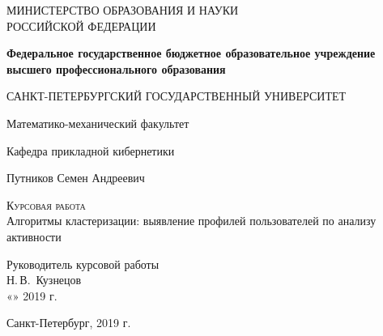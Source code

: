 \documentclass[a4paper]{article}
\begin{document}
 
\begin{titlepage}
  \begin{center}
    \large
    МИНИСТЕРСТВО ОБРАЗОВАНИЯ И НАУКИ\\ РОССИЙСКОЙ ФЕДЕРАЦИИ
     
    \textbf{Федеральное государственное бюджетное образовательное учреждение высшего профессионального образования}
    \vspace{0.5cm}
 
    САНКТ-ПЕТЕРБУРГСКИЙ ГОСУДАРСТВЕННЫЙ УНИВЕРСИТЕТ
    \vspace{0.25cm}
     
    Математико-механический факультет
     
    Кафедра прикладной кибернетики
    \vfill
     
     
    Путников Семен Андреевич
    \vfill
 
    \textsc{Курсовая работа}\\[5mm]
     
    {\LARGE Алгоритмы кластеризации: выявление профилей пользователей по анализу активности}
  \bigskip
     
\end{center}
\vfill
 
\newlength{\ML}
\hfill\begin{minipage}{0.4\textwidth}
  Руководитель курсовой работы\\
  \underline{\hspace{\ML}} Н.\,В.~Кузнецов\\
  «\underline{\hspace{0.7cm}}» \underline{\hspace{2cm}} 2019 г.
\end{minipage}%
\bigskip
 

 
\begin{center}
  Санкт-Петербург, 2019 г.
\end{center}
\end{titlepage}
 
\newpage
     
    \tableofcontents %
\newpage
 
\newpage
\end{document}
